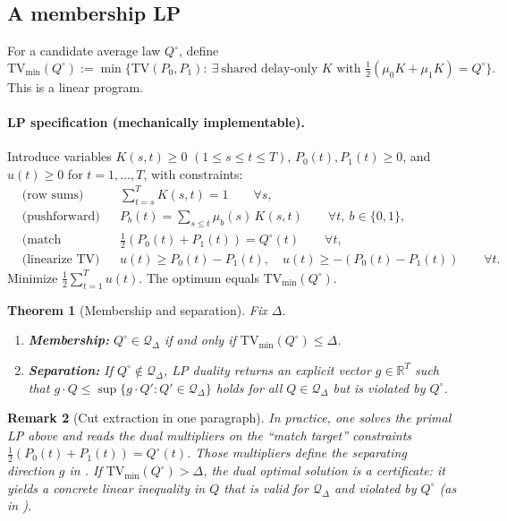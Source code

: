 \documentclass[11pt]{article}
\newtheorem{theorem}{Theorem}[section]
\newtheorem{remark}[theorem]{Remark}
\newcommand{\TV}{\mathrm{TV}}
\newcommand{\cQ}{\mathcal{Q}}
\begin{document}
\subsection{A membership LP}
For a candidate average law $Q^\circ$, define
\[
\TV_{\min}(Q^\circ)
:=\min\bigl\{\TV(P_0,P_1):\ \exists\ \text{shared delay-only }K\text{ with } \tfrac12(\mu_0K+\mu_1K)=Q^\circ\bigr\}.
\]
This is a linear program.

\paragraph{LP specification (mechanically implementable).}
Introduce variables
$K(s,t)\ge 0$ $(1\le s\le t\le T)$,
$P_0(t),P_1(t)\ge 0$,
and $u(t)\ge 0$ for $t=1,\dots,T$,
with constraints:
\begin{align*}
&\text{(row sums)} &&\sum_{t=s}^T K(s,t)=1\qquad \forall s,\\
&\text{(pushforward)} &&P_b(t)=\sum_{s\le t}\mu_b(s)\,K(s,t)\qquad \forall t,\ b\in\{0,1\},\\
&\text{(match target)} &&\tfrac12(P_0(t)+P_1(t))=Q^\circ(t)\qquad \forall t,\\
&\text{(linearize TV)} &&u(t)\ge P_0(t)-P_1(t),\quad u(t)\ge -(P_0(t)-P_1(t))\qquad \forall t.
\end{align*}
Minimize $\tfrac12\sum_{t=1}^T u(t)$. The optimum equals $\TV_{\min}(Q^\circ)$.

\begin{theorem}[Membership and separation]\label{thm:memsep}
Fix $\Delta$.
\begin{enumerate}[leftmargin=1.5em]
\item \textbf{Membership:} $Q^\circ\in\cQ_\Delta$ if and only if $\TV_{\min}(Q^\circ)\le \Delta$.
\item \textbf{Separation:} If $Q^\circ\notin\cQ_\Delta$, LP duality returns an explicit vector $g\in\mathbb{R}^T$ such that
$g\cdot Q\le \sup\{g\cdot Q':Q'\in\cQ_\Delta\}$ holds for all $Q\in\cQ_\Delta$ but is violated by $Q^\circ$.
\end{enumerate}
\end{theorem}

\begin{remark}[Cut extraction in one paragraph]\label{rem:cut}
In practice, one solves the primal LP above and reads the dual multipliers on the ``match target'' constraints
$\tfrac12(P_0(t)+P_1(t))=Q^\circ(t)$.
Those multipliers define the separating direction $g$ in .
If $\TV_{\min}(Q^\circ)>\Delta$, the dual optimal solution \emph{is} a certificate: it yields a concrete linear inequality in $Q$
that is valid for $\cQ_\Delta$ and violated by $Q^\circ$ (as in ).
\end{remark}
\end{document}

